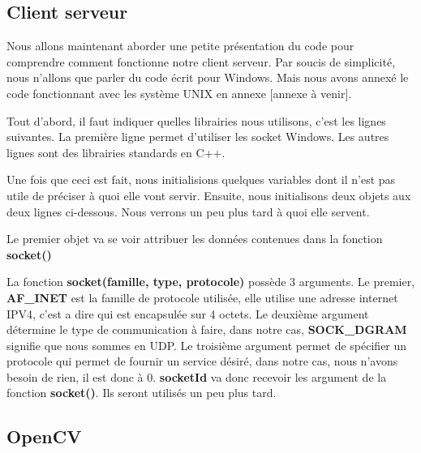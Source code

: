 \documentclass[a4paper,11pt]{report}
\begin{document}
{\subsection{Client serveur}

Nous allons maintenant aborder une petite présentation du code pour comprendre comment fonctionne notre client serveur. Par soucis de simplicité, nous n'allons que parler du code écrit pour Windows. Mais nous avons annexé le code fonctionnant avec les système UNIX en annexe [annexe à venir].

Tout d'abord, il faut indiquer quelles librairies nous utilisons, c'est les lignes suivantes. La première ligne permet d'utiliser les socket Windows. Les autres lignes sont des librairies standards en C++.


Une fois que ceci est fait, nous initialisions quelques variables dont il n'est pas utile de préciser à quoi elle vont servir. Ensuite, nous initialisons deux objets aux deux lignes ci-dessous. Nous verrons un peu plus tard à quoi elle servent. 

Le premier objet va se voir attribuer les données contenues dans la fonction \textbf{socket()}

La fonction \textbf{socket(famille, type, protocole)} possède 3 arguments. Le premier, \textbf{AF\_INET} est la famille de protocole utilisée, elle utilise une adresse internet IPV4, c'est a dire qui est encapsulée sur 4 octets. Le deuxième argument détermine le type de communication à faire, dans notre cas, \textbf{SOCK\_DGRAM} signifie que nous sommes en UDP. Le troisième argument permet de spécifier un protocole qui permet de fournir un service désiré, dans notre cas, nous n'avons besoin de rien, il est donc à $0$. \textbf{socketId} va donc recevoir les argument de la fonction \textbf{socket()}. Ils seront utilisés un peu plus tard.\\





\subsection{OpenCV}




}
\end{document}
